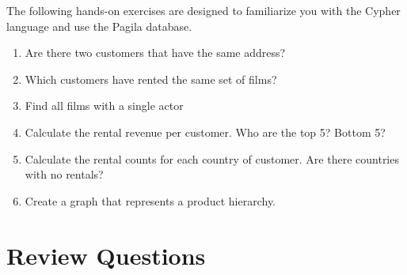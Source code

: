\begin{withcode}
\begin{exerciseboxcomputer}

The following hands-on exercises are designed to familiarize you with the Cypher language and use the Pagila database.

\begin{enumerate}[nosep]
	\item Are there two customers that have the same address?
	\item Which customers have rented the same set of films?
	\item Find all films with a single actor
	\item Calculate the rental revenue per customer. Who are the top 5? Bottom 5?
	\item Calculate the rental counts for each country of customer. Are there countries with no rentals?
	\item Create a graph that represents a product hierarchy.
\end{enumerate}
\end{exerciseboxcomputer}

\end{withcode}

\section{Review Questions}

